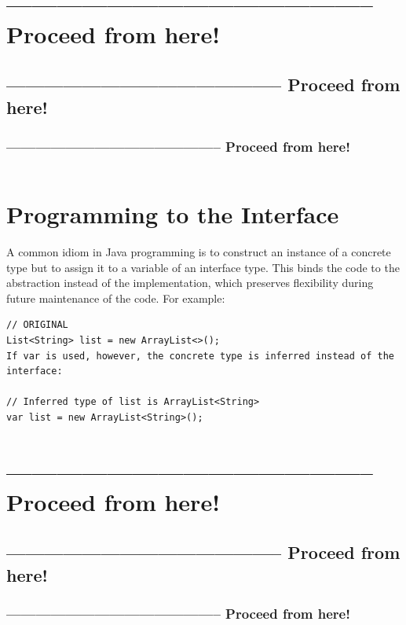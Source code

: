 \documentclass[11pt,a4paper, titlepage, parskip=half, headsepline, footsepline, cleardoublepage=current, headheight=1cm]{scrbook}
\begin{document}
\section{-------------------------------------------- Proceed from here!}
\subsection{-------------------------------------------- Proceed from here!}
\subsubsection{-------------------------------------------- Proceed from here!}
\lipsum[5]

\begin{lstlisting}
\end{lstlisting}

\section{Programming to the Interface}\label{sec:ProgrammingToTheInterface}
A common idiom in Java programming is to construct an instance of a concrete type but to assign it to a variable of an interface type. This binds the code to the abstraction instead of the implementation, which preserves flexibility during future maintenance of the code. For example:

\begin{lstlisting}
// ORIGINAL
List<String> list = new ArrayList<>();
If var is used, however, the concrete type is inferred instead of the interface:

// Inferred type of list is ArrayList<String>
var list = new ArrayList<String>();
\end{lstlisting}

\section{-------------------------------------------- Proceed from here!}
\subsection{-------------------------------------------- Proceed from here!}
\subsubsection{-------------------------------------------- Proceed from here!}
\autocite{Cymerman:SmarterJavaDevelopment}
\autocite{Fejer:ProgramToInterfaces}
\autocite{Pavlutin:ProgrammingToInterface}
\autocite{}
\autocite{}
\autocite{}
\autocite{}
\autocite{}
\autocite{}
\autocite{}
\lipsum[5]
\end{document}
